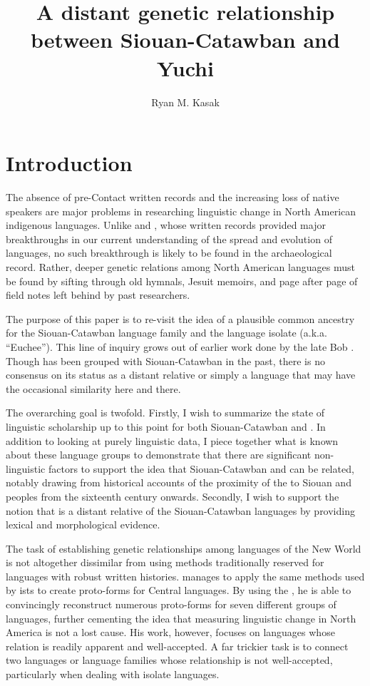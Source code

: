\documentclass[output=paper]{LSP/langsci}
\author{Ryan M. Kasak}
\title{A distant genetic relationship between {Siouan-Catawban} and {Yuchi}}
\begin{document}
\section{Introduction}\label{sec:kasak:1}

The absence of pre-Contact written records and the increasing loss of native speakers are major problems in researching linguistic change in North American indigenous languages. Unlike  and , whose written records provided major breakthroughs in our current understanding of the spread and evolution of  languages, no such breakthrough is likely to be found in the archaeological record. Rather, deeper genetic relations among North American languages must be found by sifting through old hymnals, Jesuit memoirs, and page after page of field notes left behind by past researchers.

The purpose of this paper is to re-visit the idea of a plausible common ancestry for the Siouan-Catawban language family and the language isolate  (a.k.a. ``Euchee''). This line of inquiry grows out of earlier work done by the late Bob \citet{Rankin1996,Rankin1998scy}. Though  has been grouped with Siouan-Catawban in the past, there is no consensus on its status as a distant relative or simply a language that may have the occasional similarity here and there.

The overarching goal is twofold. Firstly, I wish to summarize the state of linguistic scholarship up to this point for both Siouan-Catawban and . In addition to looking at purely linguistic data, I piece together what is known about these language groups to demonstrate that there are significant non-linguistic factors to support the idea that Siouan-Catawban and  can be related, notably drawing from historical accounts of the proximity of the  to Siouan and  peoples from the sixteenth century onwards. Secondly, I wish to support the notion that  is a distant relative of the Siouan-Catawban languages by providing lexical and morphological evidence.

The task of establishing genetic relationships among languages of the New World is not altogether dissimilar from using methods traditionally reserved for languages with robust written histories. \citet{Bloomfield1925} manages to apply the same methods used by ists to create proto-forms for Central  languages. By using the , he is able to convincingly reconstruct numerous proto-forms for seven different groups of  languages, further cementing the idea that measuring linguistic change in North America is not a lost cause. His work, however, focuses on languages whose relation is readily apparent and well-accepted. A far trickier task is to connect two languages or language families whose relationship is not well-accepted, particularly when dealing with isolate languages. 
\end{document}
